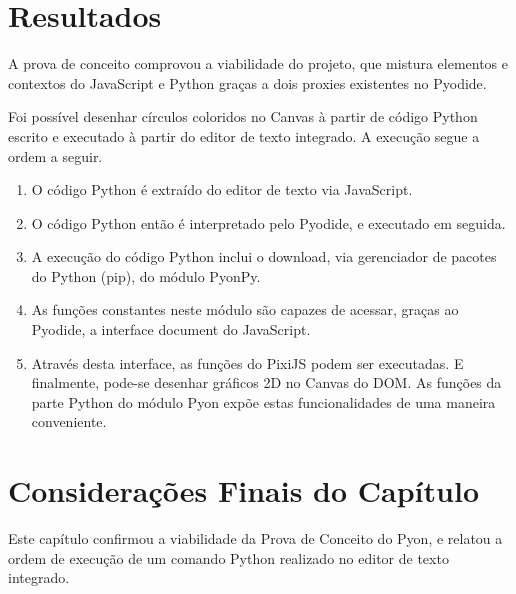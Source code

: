\section{Resultados}

A prova de conceito comprovou a viabilidade do projeto, que mistura elementos e contextos do JavaScript e Python graças a dois proxies existentes no Pyodide.

Foi possível desenhar círculos coloridos no Canvas à partir de código Python escrito e executado à partir do editor de texto integrado. A execução segue a ordem a seguir.

\begin{enumerate}
    \item O código Python é extraído do editor de texto via JavaScript.
    \item O código Python então é interpretado pelo Pyodide, e executado em seguida.
    \item A execução do código Python inclui o download, via gerenciador de pacotes do Python (pip), do módulo PyonPy.
    \item As funções constantes neste módulo são capazes de acessar, graças ao Pyodide, a interface
    document do JavaScript. 
    \item Através desta interface, as funções do PixiJS podem ser executadas. E finalmente, pode-se desenhar gráficos 2D no Canvas do DOM. As funções da parte Python do módulo Pyon expõe estas funcionalidades de uma maneira conveniente.
\end{enumerate}

\section{Considerações Finais do Capítulo}
Este capítulo confirmou a viabilidade da Prova de Conceito do Pyon, e relatou a ordem de execução 
de um comando Python realizado no editor de texto integrado.